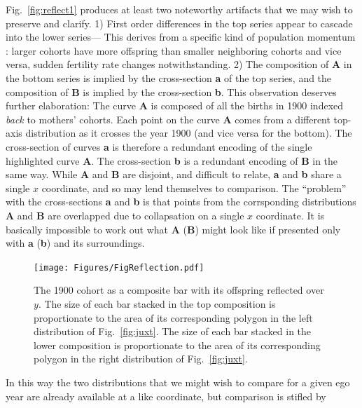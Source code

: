 \documentclass{article}
\begin{document}
Fig.~\ref{fig:reflect1} produces at least two noteworthy artifacts that we may wish to preserve and clarify. 1) First order differences in the top series appear to cascade into the lower series--- This derives from a specific kind of population momentum \citep{keyfitz1971momentum}: larger cohorts have more offspring than smaller neighboring cohorts and vice versa, sudden fertility rate changes notwithstanding. 2) The composition of \textbf{A} in the bottom series is implied by the cross-section \textbf{a} of the top series, and the composition of \textbf{B} is implied by the cross-section \textbf{b}. This observation deserves further elaboration: The curve \textbf{A} is composed of all the births in 1900 indexed \emph{back} to mothers' cohorts. Each point on the curve \textbf{A} comes from a different top-axis distribution as it crosses the year 1900 (and vice versa for the bottom). The cross-section of curves \textbf{a} is therefore a redundant encoding of the single highlighted curve \textbf{A}. The cross-section \textbf{b} is a redundant encoding of \textbf{B} in the same way. While \textbf{A} and \textbf{B} are disjoint, and difficult to relate, \textbf{a} and \textbf{b} share a single $x$ coordinate, and so may lend themselves to comparison. The ``problem'' with the cross-sections \textbf{a} and \textbf{b} is that points from the corrsponding distributions \textbf{A} and \textbf{B} are overlapped due to collapsation on a single $x$ coordinate. It is basically impossible to work out what \textbf{A} (\textbf{B}) might look like if presented only with \textbf{a} (\textbf{b}) and its surroundings. 
\pagebreak
\begin{figure}
 \centering
        \texttt{[image: Figures/FigReflection.pdf]}
        \caption{The 1900 cohort as a composite bar with its offspring reflected over $y$. The size of each bar stacked in the top composition is proportionate to the area of its corresponding polygon in the left distribution of Fig.~\ref{fig:juxt}. The size of each bar stacked in the lower composition is proportionate to the area of its corresponding polygon in the right distribution of Fig.~\ref{fig:juxt}.}
          \label{fig:refl}
\end{figure}
In this way the two distributions that we might wish to compare for a given ego
year are already available at a like coordinate, but comparison is stifled by
\end{document}

